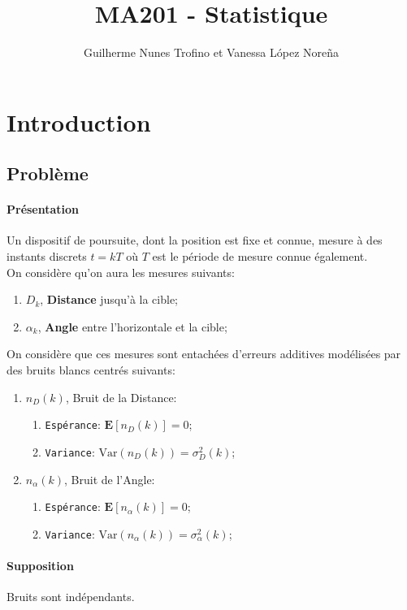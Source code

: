 \documentclass{article}
\title{MA201 - Statistique}
\author{Guilherme Nunes Trofino et Vanessa López Noreña}
\begin{document}
\maketitle

\newpage\tableofcontents

\section*{Introduction}
\subsection*{Problème}
\paragraph{Présentation}Un dispositif de poursuite, dont la position est fixe et connue, mesure à des instants discrets $t = kT$ où $T$ est le période de mesure connue également.\\

\noindent On considère qu'on aura les mesures suivants:
\begin{enumerate}
    \item $D_{k}$, \textbf{Distance} jusqu'à la cible;
    \item $\alpha_{k}$, \textbf{Angle} entre l'horizontale et la cible;
\end{enumerate}
On considère que ces mesures sont entachées d'erreurs additives modélisées par des bruits blancs centrés suivants:
\begin{enumerate}
    \item $n_{D}(k)$, Bruit de la Distance:
    \begin{enumerate}[noitemsep]
        \item \texttt{Espérance}: $\mathbf{E}[n_{D}(k)] = 0$;
        \item \texttt{Variance}: $\text{Var}(n_{D}(k)) = \sigma_{D}^{2}(k)$;
    \end{enumerate}
    \item $n_{\alpha}(k)$, Bruit de l'Angle:
        \begin{enumerate}[noitemsep]
        \item \texttt{Espérance}: $\mathbf{E}[n_{\alpha}(k)] = 0$;
        \item \texttt{Variance}: $\text{Var}(n_{\alpha}(k)) = \sigma_{\alpha}^{2}(k)$;
    \end{enumerate}
\end{enumerate}
\paragraph{Supposition}Bruits sont indépendants.
\end{document}
